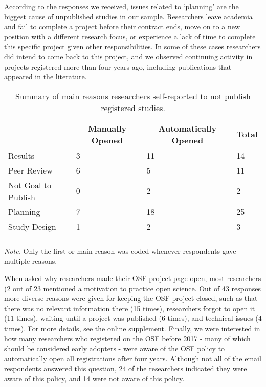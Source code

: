 \documentclass[
  ,jou, a4paper,floatsintext]{apa6}
\begin{document}
According to the responses we received, issues related to `planning' are the biggest cause of unpublished studies in our sample. Researchers leave academia and fail to complete a project before their contract ends, move on to a new position with a different research focus, or experience a lack of time to complete this specific project given other responsibilities. In some of these cases researchers did intend to come back to this project, and we observed continuing activity in projects registered more than four years ago, including publications that appeared in the literature.

\begin{table*}[tbp]

\begin{center}
\begin{threeparttable}

\caption{\label{tab:table-reasons}Summary of main reasons researchers self-reported to not publish registered studies.}

\begin{tabular}{llll}
\toprule
 & \multicolumn{1}{c}{Manually Opened} & \multicolumn{1}{c}{Automatically Opened} & \multicolumn{1}{c}{Total}\\
\midrule
Results & 3 & 11 & 14\\
Peer Review & 6 & 5 & 11\\
Not Goal to Publish & 0 & 2 & 2\\
Planning & 7 & 18 & 25\\
Study Design & 1 & 2 & 3\\
\bottomrule
\addlinespace
\end{tabular}

\begin{tablenotes}[para]
\normalsize{\textit{Note.} Only the first or main reason was coded whenever respondents gave multiple reasons.}
\end{tablenotes}

\end{threeparttable}
\end{center}

\end{table*}

When asked why researchers made their OSF project page open, most researchers (2 out of 23 mentioned a motivation to practice open science. Out of 43 responses more diverse reasons were given for keeping the OSF project closed, such as that there was no relevant information there (15 times), researchers forgot to open it (11 times), waiting until a project was published (6 times), and technical issues (4 times). For more details, see the online supplement. Finally, we were interested in how many researchers who registered on the OSF before 2017 - many of which should be considered early adopters - were aware of the OSF policy to automatically open all registrations after four years. Although not all of the email respondents answered this question, 24 of the researchers indicated they were aware of this policy, and 14 were not aware of this policy.
\end{document}
